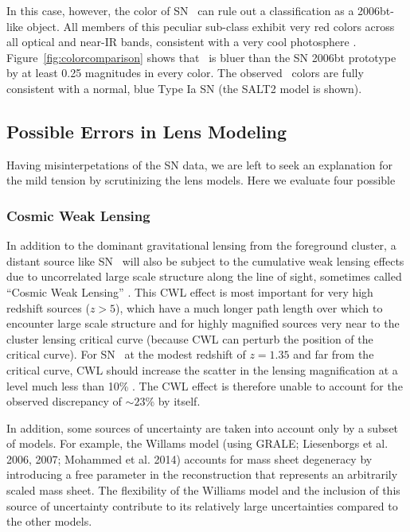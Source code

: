 In this case, however, the color of SN \tomas\ can rule out a
classification as a 2006bt-like object.  All members of this peculiar
sub-class exhibit very red colors across all optical and near-IR
bands, consistent with a very cool photosphere \citep{Foley:2010}.
Figure~\ref{fig:colorcomparison} shows that \tomas\ is bluer than the
SN 2006bt prototype by at least 0.25 magnitudes in every color. The
observed \tomas\ colors are fully consistent with a normal, blue
Type Ia SN (the SALT2 model is shown).



\subsection{Possible Errors in Lens Modeling}
\label{sec:LensModelErrors}

Having  misinterpetations of the SN
data, we are left to seek an explanation for the mild tension by
scrutinizing the lens models.  Here we evaluate four
possible 

\subsubsection{Cosmic Weak Lensing}
In addition to the dominant gravitational lensing from the foreground
cluster, a distant source like SN \tomas\ will also be subject to the
cumulative weak lensing effects due to uncorrelated large scale
structure along the line of sight, sometimes called ``Cosmic Weak
Lensing'' \citep[CWL;][]{Wong:2011,Host:2012,Collett:2013,Greene:2013,Bayliss:2014,McCully:2014,DAloisio:2014}.
This CWL effect is most important for very high redshift sources
($z>5$), which have a much longer path length over which to encounter
large scale structure and for highly magnified sources very near to
the cluster lensing critical curve (because CWL can perturb the
position of the critical curve).  For SN \tomas\ at the modest
redshift of $z=1.35$ and far from the critical curve, CWL should
increase the scatter in the lensing magnification at a level much less
than 10\% \citep{DAloisio:2014}.  The CWL effect is therefore unable
to account for the observed discrepancy of $\sim23$\% by
itself.

In
addition, some sources of uncertainty are taken into account only by a
subset of models. For example, the Willams model (using GRALE;
Liesenborgs et al. 2006, 2007; Mohammed et al. 2014) accounts for mass
sheet degeneracy by introducing a free parameter in the reconstruction
that represents an arbitrarily scaled mass sheet. The flexibility of
the Williams model and the inclusion of this source of uncertainty
contribute to its relatively large uncertainties compared to the other
models.

